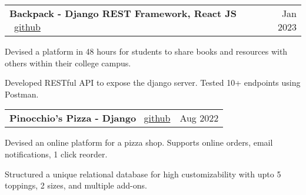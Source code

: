 \documentclass[a4paper,20pt]{article}
\makeatletter
\newcommand{\resumeSmallSubheading}[2]{
  \vspace{-1pt}\item
    \begin{tabular*}{0.97\textwidth}{l@{\extracolsep{\fill}}r}
      #1 & #2 \\
    \end{tabular*}\vspace{-8pt}
}
\makeatother
\begin{document}
    \resumeSmallSubheading{\textbf{Backpack - Django REST Framework, React JS \textbar} ~\href{https://github.com/satyamrs00/backpack/}{github}}{Jan 2023} %
        
    \begin{description}[font=$\bullet$]
        \item {Devised a platform in 48 hours for students to share books and resources with others within their college campus.}
    \vspace{-5pt}
        \item {Developed RESTful API to expose the django server. Tested 10+ endpoints using Postman.}
    \end{description}

    \vspace{-5pt}

    \resumeSmallSubheading{\textbf{Pinocchio's Pizza - Django \textbar} ~\href{https://github.com/satyamrs00/pizza/}{github}}{Aug 2022} %
    
    \begin{description}[font=$\bullet$]
        \item {Devised an online platform for a pizza shop. Supports online orders, email notifications, 1 click reorder.}
    \vspace{-5pt}
        \item {Structured a unique relational database for high customizability with upto 5 toppings, 2 sizes, and multiple add-ons.}
    \vspace{-5pt}
    \end{description}

    
\end{document}
